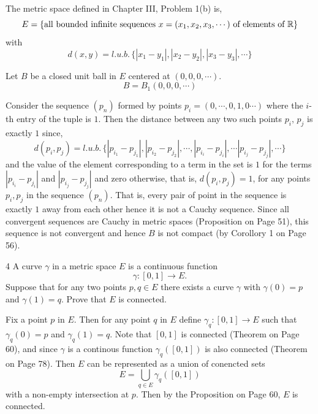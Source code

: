 \documentclass[12pt]{article}
\begin{document}
\begin{solution}
    \bbni 
    
    The metric space defined in Chapter III, Problem 1(b) is, 
            \[E = \{\text{all bounded infinite sequences } x = (x_1, x_2, x_3, \cdots) \text{ of elements of } \mathbb R \}\]        
    with 
            \[d(x,y) = l.u.b. \, \{|x_1 - y_1|, |x_2 - y_2|, |x_3 - y_3|, \cdots \}\]

    Let $B$ be a closed unit ball in $E$ centered at $(0,0,0,\cdots)$. 
             \[B = B_1(0,0, 0, \cdots)\]

    Consider the sequence $(p_n)$ formed by points $p_i = (0, \cdots, 0, 1, 0 \cdots)$ where the $i$-th entry of the tuple is $1$. Then the distance between any two such points $p_i, \, p_j$ is exactly $1$ since, 
    \[d(p_i,p_j) = l.u.b. \, \{|p_{i_1} - p_{j_1}|, |p_{i_2} - p_{j_2}|, \cdots, |p_{i_i} - p_{j_i}|, \cdots |p_{i_j} - p_{j_j}|, \cdots\}\]
    and the value of the element corresponding to a term in the set is $1$ for the terms $|p_{i_i} - p_{j_i}|$ and $|p_{i_j} - p_{j_j}|$ and zero otherwise, that is, $d(p_i, p_j) = 1$, for any points $p_i, p_j$ in the sequence $(p_n)$. That is, every pair of point in the sequence is exactly $1$ away from each other hence it is not a Cauchy sequence. Since all convergent sequences are Cauchy in metric spaces (Proposition on Page 51), this sequence is not convergent and hence $B$ is not compact (by Corollory 1 on Page 56). 
\end{solution}

\newpage


\begin{problem}{4}
    A curve $\gamma$ in a metric space $E$ is a continuous function
    \[\gamma : [0,1] \to E.\]
    Suppose that for any two points $p,q \in E$ there exists a curve $\gamma$ with $\gamma(0)=p$
    and $\gamma(1)=q$. Prove that $E$ is connected.
\end{problem}

\begin{solution}
    \bbni

    Fix a point $p$ in $E$. Then for any point $q$ in $E$ define $\gamma_q: [0,1] \to E$ such that  $\gamma_q(0) = p$ and $\gamma_q(1) = q$. Note that $[0,1]$ is connected (Theorem on Page 60), and since $\gamma$ is a continous function $\gamma_q([0,1])$ is also connected (Theorem on Page 78). Then $E$ can be represented as a union of conencted sets 
    \[E = \underset{q\in E}{\bigcup} \gamma_q([0,1])\]
    with a non-empty intersection at $p$. Then by the Proposition on Page 60, $E$ is connected.
\end{solution}
\end{document}
